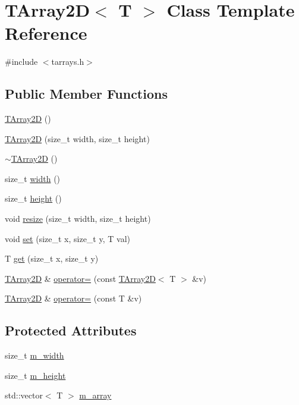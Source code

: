 \hypertarget{classTArray2D}{
\section{TArray2D$<$ T $>$ Class Template Reference}
\label{classTArray2D}
}


{\ttfamily \#include $<$tarrays.h$>$}\subsection*{Public Member Functions}
\begin{DoxyCompactItemize}
\item 
\hyperlink{classTArray2D_a5328f64d2dcc8fc754f03c2d5f3f2609}{TArray2D} ()
\item 
\hyperlink{classTArray2D_a0bc191a85733601b9850898f521e9bb9}{TArray2D} (size\_\-t width, size\_\-t height)
\item 
\hyperlink{classTArray2D_ad42133d15fccad77acb8e73c79c94733}{$\sim$TArray2D} ()
\item 
size\_\-t \hyperlink{classTArray2D_ac1831c05d26c7fa073b6d4c256ea911d}{width} ()
\item 
size\_\-t \hyperlink{classTArray2D_affa64168cd2a61534974fbe2fa7ba5a8}{height} ()
\item 
void \hyperlink{classTArray2D_aad2277f4ebb58d11211bb405eea6d631}{resize} (size\_\-t width, size\_\-t height)
\item 
void \hyperlink{classTArray2D_a0ab9fdf7a0c039c8519e711ca319c7bc}{set} (size\_\-t x, size\_\-t y, T val)
\item 
T \hyperlink{classTArray2D_aa1553819f109c409fd8c221c40851b9f}{get} (size\_\-t x, size\_\-t y)
\item 
\hyperlink{classTArray2D}{TArray2D} \& \hyperlink{classTArray2D_adc97abfe0160c0377fd391f73cf7cb16}{operator=} (const \hyperlink{classTArray2D}{TArray2D}$<$ T $>$ \&v)
\item 
\hyperlink{classTArray2D}{TArray2D} \& \hyperlink{classTArray2D_a5a320ff3b9af4cf716d53c238f01baf4}{operator=} (const T \&v)
\end{DoxyCompactItemize}
\subsection*{Protected Attributes}
\begin{DoxyCompactItemize}
\item 
size\_\-t \hyperlink{classTArray2D_a9e3512ab08536241799945098c9c12cf}{m\_\-width}
\item 
size\_\-t \hyperlink{classTArray2D_a13bed626ce881556d57b34cf20951486}{m\_\-height}
\item 
std::vector$<$ T $>$ \hyperlink{classTArray2D_a81bcaaa46567b92d0bd375f32089cbef}{m\_\-array}
\end{DoxyCompactItemize}
